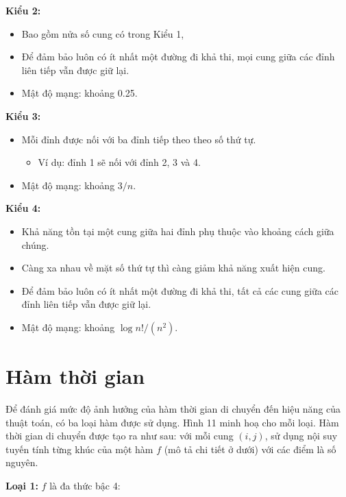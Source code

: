 \documentclass[../main.tex]{subfiles}
\begin{document}
\textbf{Kiểu 2:}

\begin{itemize}
\tightlist
\item
  Bao gồm nửa số cung có trong Kiểu 1,
\item
  Để đảm bảo luôn có ít nhất một đường đi khả thi, mọi cung giữa các
  đỉnh liên tiếp vẫn được giữ lại.
\item
  Mật độ mạng: khoảng 0.25.
\end{itemize}

\textbf{Kiểu 3:}

\begin{itemize}
\tightlist
\item
  Mỗi đỉnh được nối với ba đỉnh tiếp theo theo số thứ tự.

  \begin{itemize}
  \tightlist
  \item
    Ví dụ: đỉnh 1 sẽ nối với đỉnh 2, 3 và 4.
  \end{itemize}
\item
  Mật độ mạng: khoảng \(3/n\).
\end{itemize}

\textbf{Kiểu 4:}

\begin{itemize}
\tightlist
\item
  Khả năng tồn tại một cung giữa hai đỉnh phụ thuộc vào khoảng cách giữa
  chúng.
\item
  Càng xa nhau về mặt số thứ tự thì càng giảm khả năng xuất hiện cung.
\item
  Để đảm bảo luôn có ít nhất một đường đi khả thi, tất cả các cung giữa
  các đỉnh liên tiếp vẫn được giữ lại.
\item
  Mật độ mạng: khoảng \(\log n!/(n^2)\).
\end{itemize}

\section{Hàm thời gian}\label{huxe0m-thux1eddi-gian}

Để đánh giá mức độ ảnh hưởng của hàm thời gian di chuyển đến hiệu năng
của thuật toán, có ba loại hàm được sử dụng. Hình 11 minh hoạ cho mỗi
loại. Hàm thời gian di chuyển được tạo ra như sau: với mỗi cung
\((i,j)\), sử dụng nội suy tuyến tính từng khúc của một hàm \(f\) (mô tả
chi tiết ở dưới) với các điểm là số nguyên.

\textbf{Loại 1:} \(f\) là đa thức bậc 4: 
\end{document}

